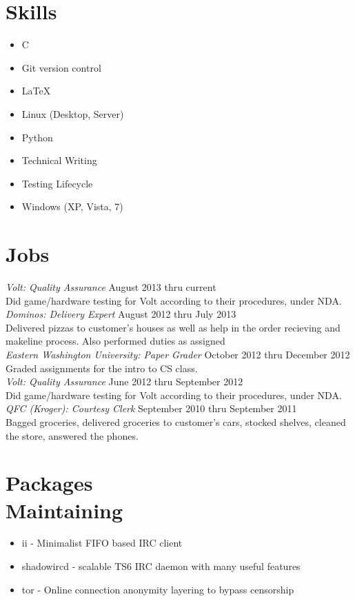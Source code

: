 \documentclass[line, margin]{res}
\begin{document}
\begin{resume}
\section{Skills}
\begin{multicols}{2}
  \begin{itemize}
    \item C
    \item Git version control
    \item \LaTeX
    \item Linux (Desktop, Server)
    \item Python
    \item Technical Writing
    \item Testing Lifecycle
    \item Windows (XP, Vista, 7)
  \end{itemize}
\end{multicols}

\section{Jobs}
 \textit{Volt: Quality Assurance} \hfill August 2013 thru current \\
 Did game/hardware testing for Volt according to their procedures, under NDA. \\ [6pt]
 \textit{Dominos: Delivery Expert} \hfill August 2012 thru July 2013 \\
 Delivered pizzas to customer's houses as well as help in the order
 recieving and makeline process. Also performed duties as assigned \\ [6pt]
 \textit{Eastern Washington University: Paper Grader} \hfill October 2012 thru December 2012 \\
 Graded assignments for the intro to CS class. \\ [6pt]
 \textit{Volt: Quality Assurance} \hfill June 2012 thru September 2012 \\
 Did game/hardware testing for Volt according to their procedures, under NDA. \\ [6pt]
 \textit{QFC (Kroger): Courtesy Clerk} \hfill September 2010 thru September 2011 \\
 Bagged groceries, delivered groceries to customer's cars, stocked
 shelves, cleaned the store, answered the phones. \\ 

\section{Packages\\Maintaining}
\begin{itemize}
  \item ii - Minimalist FIFO based IRC client
  \item shadowircd - scalable TS6 IRC daemon with many useful features
  \item tor - Online connection anonymity layering to bypass censorship
\end{itemize}

\end{resume}
\end{document}
